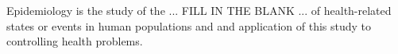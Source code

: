 Epidemiology is the study of the ... FILL IN THE BLANK ... of health-related states or events in human populations and and application of this study to controlling health problems.

\begin{MultipleChoice}[itemname=I-3]
\end{MultipleChoice}

